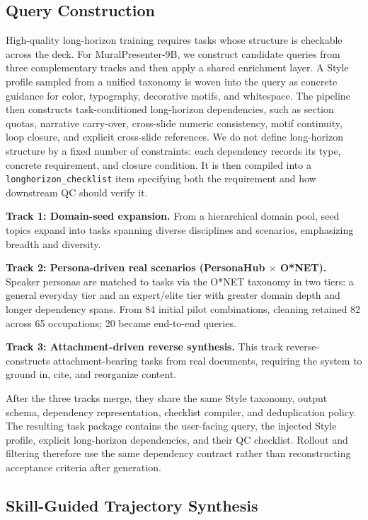 \subsection{Query Construction}

High-quality long-horizon training requires tasks whose structure is checkable across the deck. For MuralPresenter-9B, we construct candidate queries from three complementary tracks and then apply a shared enrichment layer. A Style profile sampled from a unified taxonomy is woven into the query as concrete guidance for color, typography, decorative motifs, and whitespace. The pipeline then constructs task-conditioned long-horizon dependencies, such as section quotas, narrative carry-over, cross-slide numeric consistency, motif continuity, loop closure, and explicit cross-slide references. We do not define long-horizon structure by a fixed number of constraints: each dependency records its type, concrete requirement, and closure condition. It is then compiled into a \texttt{longhorizon\_checklist} item specifying both the requirement and how downstream QC should verify it.

\textbf{Track 1: Domain-seed expansion.} From a hierarchical domain pool, seed topics expand into tasks spanning diverse disciplines and scenarios, emphasizing breadth and diversity.

\textbf{Track 2: Persona-driven real scenarios (PersonaHub \(\times\) O*NET).} Speaker personas are matched to tasks via the O*NET taxonomy in two tiers: a general everyday tier and an expert/elite tier with greater domain depth and longer dependency spans. From 84 initial pilot combinations, cleaning retained 82 across 65 occupations; 20 became end-to-end queries.

\textbf{Track 3: Attachment-driven reverse synthesis.} This track reverse-constructs attachment-bearing tasks from real documents, requiring the system to ground in, cite, and reorganize content.

After the three tracks merge, they share the same Style taxonomy, output schema, dependency representation, checklist compiler, and deduplication policy. The resulting task package contains the user-facing query, the injected Style profile, explicit long-horizon dependencies, and their QC checklist. Rollout and filtering therefore use the same dependency contract rather than reconstructing acceptance criteria after generation.

\subsection{Skill-Guided Trajectory Synthesis}

